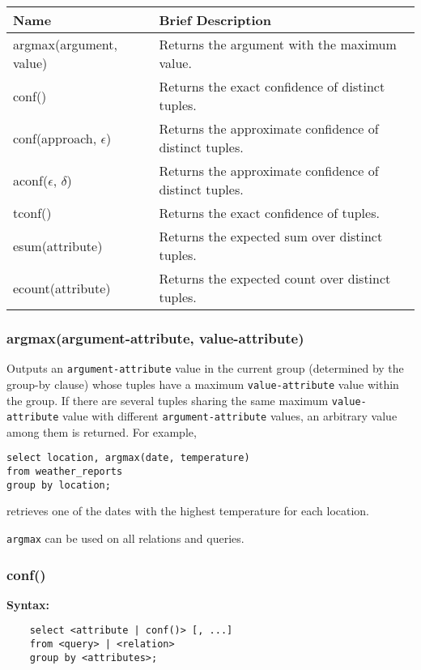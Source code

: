 \begin{small}
\begin{tabular}{|l|l|}
\hline
Name & Brief Description  \\
\hline
argmax(argument, value) & Returns the argument with the maximum value.	 \\ \hline
conf() & Returns the exact confidence of distinct tuples.	 \\ \hline
conf(approach, $\epsilon$) & Returns the approximate confidence of distinct tuples.	 \\ \hline
aconf($\epsilon$, $\delta$) & Returns the approximate confidence of distinct tuples.	 \\ \hline
tconf() & Returns the exact confidence of tuples.	\\ \hline
esum(attribute) & Returns the expected sum over distinct tuples.	 \\ \hline
ecount(attribute) & Returns the expected count over distinct tuples.	 \\ \hline
\end{tabular}
\end{small}

\setcounter{secnumdepth}{3}

\subsubsection{argmax(argument-attribute, value-attribute)}

Outputs an {\tt argument-attribute} value in the current group (determined by the group-by clause) whose tuples have a maximum {\tt value-attribute} value within the group. If there are several tuples sharing the same maximum {\tt value-attribute} value with different {\tt argument-attribute} values, an arbitrary value among them is returned. For example, 
\begin{verbatim}
select location, argmax(date, temperature)
from weather_reports
group by location; 
\end{verbatim}
retrieves one of the dates with the highest temperature for each location.

{\tt argmax} can be used on all relations and queries.

\subsubsection{conf()}

\noindent \textbf{Syntax:}
\begin{verbatim}
	select <attribute | conf()> [, ...]
	from <query> | <relation>
	group by <attributes>; 
\end{verbatim}

